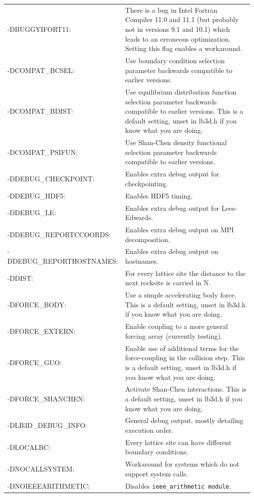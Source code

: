 \documentclass[a4paper]{article}
\begin{document}
\begin{tabular}{p{} p{}}

-DBUGGYIFORT11: & There is a bug in Intel Fortran Compiler 11.0 and 11.1 (but probably not in versions 9.1 and 10.1) which leads to an erroneous optimization. Setting this flag enables a workaround.\\
-DCOMPAT\_BCSEL: & Use boundary condition selection parameter backwards compatible to earlier versions.\\
-DCOMPAT\_BDIST: & Use equilibrium distribution function selection parameter backwards compatible to earlier versions. This is a default setting, unset in lb3d.h if you know what you are doing.\\
-DCOMPAT\_PSIFUN: & Use Shan-Chen density functional selection parameter backwards compatible to earlier versions.\\
-DDEBUG\_CHECKPOINT: & Enables extra debug output for checkpointing.\\
-DDEBUG\_HDF5: & Enables HDF5 timing.\\
-DDEBUG\_LE: & Enables extra debug output for Lees-Edwards.\\
-DDEBUG\_REPORTCCOORDS: & Enables extra debug output on MPI decomposition.\\
-DDEBUG\_REPORTHOSTNAMES: & Enables extra debug output on hostnames.\\
-DDIST: & For every lattice site the distance to the next rocksite is carried in N.\\
-DFORCE\_BODY: & Use a simple accelerating body force. This is a default setting, unset in lb3d.h if you know what you are doing.\\
-DFORCE\_EXTERN: & Enable coupling to a more general forcing array (currently testing).\\
-DFORCE\_GUO: & Enable use of additional terms for the force-coupling in the collision step. This is a default setting, unset in lb3d.h if you know what you are doing.\\
-DFORCE\_SHANCHEN: & Activate Shan-Chen interactions. This is a default setting, unset in lb3d.h if you know what you are doing.\\
-DLB3D\_DEBUG\_INFO: & General debug output, mostly detailing execution order. \\
-DLOCALBC:& Every lattice site can have different boundary conditions.\\
-DNOCALLSYSTEM: & Workaround for systems which do not support system calls.\\
-DNOIEEEARITHMETIC: & Disables {\tt ieee\_arithmetic module}.\\

\end{tabular}
\end{document}
